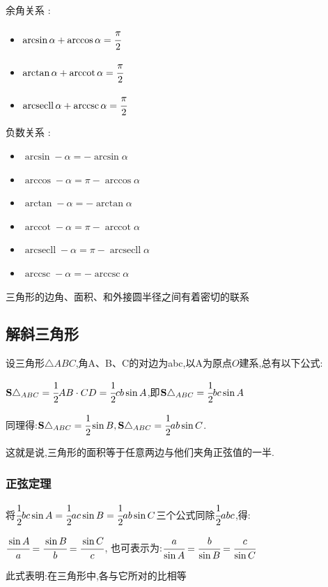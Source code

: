 \documentclass[UTF8,12pt]{ctexbook}
\DeclareMathOperator{\arccot}{arccot}
\DeclareMathOperator{\arcsec}{arcsecll}
\DeclareMathOperator{\arccsc}{arccsc}
\begin{document}
{{{  余角关系 :
  \begin{itemize}
    \item $\arcsin\alpha + \arccos\alpha = \cfrac{\pi}{2}$
    \item $\arctan\alpha + \arccot\alpha = \cfrac{\pi}{2}$
    \item $\arcsec\alpha + \arccsc\alpha = \cfrac{\pi}{2}$
  \end{itemize}

  负数关系 :
  \begin{itemize}
    \item $\arcsin-\alpha = -\arcsin\alpha$
    \item $\arccos-\alpha = \pi - \arccos\alpha$
    \item $\arctan-\alpha = -\arctan\alpha$
    \item $\arccot-\alpha = \pi - \arccot\alpha$
    \item $\arcsec-\alpha = \pi - \arcsec\alpha$
    \item $\arccsc-\alpha = -\arccsc\alpha$
  \end{itemize}

}%

三角形的边角、面积、和外接圆半径之间有着密切的联系

\subsection{解斜三角形}{
设三角形$\triangle ABC$,角A、B、C的对边为abc,以A为原点$O$建系,总有以下公式:

$\mathbf{S}\triangle_{ABC} = \cfrac{1}{2}AB \cdot CD = \cfrac{1}{2}cb\sin A$,即$\mathbf{S}\triangle_{ABC} = \cfrac{1}{2}bc\sin A$

同理得:$\mathbf{S}\triangle_{ABC} = \cfrac{1}{2}\sin B, \mathbf{S}\triangle_{ABC} = \cfrac{1}{2}ab\sin C$.

这就是说,三角形的面积等于任意两边与他们夹角正弦值的一半.

\subsubsection{正弦定理}
将$\cfrac{1}{2}bc\sin A = \cfrac{1}{2}ac\sin B = \cfrac{1}{2}ab\sin C$三个公式同除$\cfrac{1}{2}abc$,得:

$\cfrac{\sin A}{a} = \cfrac{\sin B}{b} = \cfrac{\sin C}{c}$, 也可表示为:$\cfrac{a}{\sin A} = \cfrac{b}{\sin B} = \cfrac{c}{\sin C}$

此式表明:在三角形中,各{}与它所对{}的比相等

}}}
\end{document}
